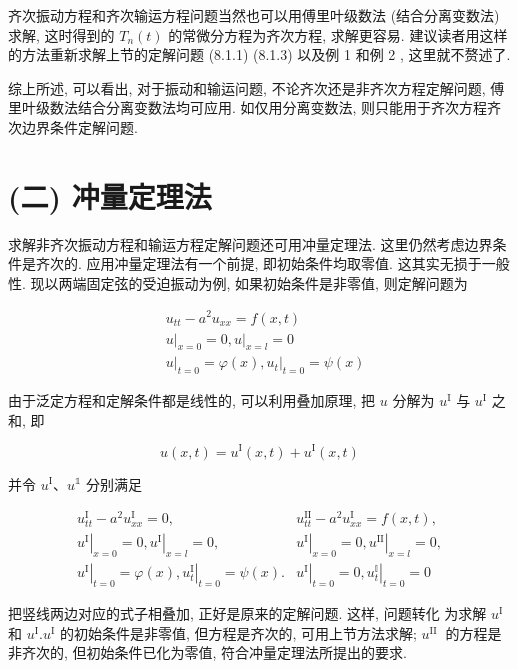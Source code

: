 齐次振动方程和齐次输运方程问题当然也可以用傅里叶级数法 (结合分离变数法) 求解, 这时得到的 $T_{n}(t)$ 的常微分方程为齐次方程, 求解更容易. 建议读者用这样的方法重新求解上节的定解问题 (8.1.1) (8.1.3) 以及例 1 和例 2 , 这里就不赘述了.

综上所述, 可以看出, 对于振动和输运问题, 不论齐次还是非齐次方程定解问题, 傅里叶级数法结合分离变数法均可应用. 如仅用分离变数法, 则只能用于齐次方程齐次边界条件定解问题.

\section{(二) 冲量定理法}
求解非齐次振动方程和输运方程定解问题还可用冲量定理法. 这里仍然考虑边界条件是齐次的. 应用冲量定理法有一个前提, 即初始条件均取零值. 这其实无损于一般性. 现以两端固定弦的受迫振动为例, 如果初始条件是非零值, 则定解问题为

$$
\begin{aligned}
& u_{t t}-a^{2} u_{x x}=f(x, t) \\
& \left.u\right|_{x=0}=0,\left.u\right|_{x=l}=0 \\
& \left.u\right|_{t=0}=\varphi(x),\left.u_{t}\right|_{t=0}=\psi(x)
\end{aligned}
$$

由于泛定方程和定解条件都是线性的, 可以利用叠加原理, 把 $u$ 分解为 $u^{\mathrm{I}}$ 与 $u^{\mathrm{I}}$ 之和, 即

$$
u(x, t)=u^{\mathrm{I}}(x, t)+u^{\mathrm{I}}(x, t)
$$

并令 $u^{\mathrm{I}} 、 u^{\mathbb{1}}$ 分别满足

$$
\begin{array}{l|l}
u_{t t}^{\mathrm{I}}-a^{2} u_{x x}^{\mathrm{I}}=0, & u_{t t}^{\mathrm{II}}-a^{2} u_{x x}^{\mathrm{I}}=f(x, t), \\
\left.u^{\mathrm{I}}\right|_{x=0}=0,\left.u^{\mathrm{I}}\right|_{x=l}=0, & \left.u^{\mathrm{I}}\right|_{x=0}=0,\left.u^{\mathrm{II}}\right|_{x=l}=0, \\
\left.u^{\mathrm{I}}\right|_{t=0}=\varphi(x),\left.u_{t}^{\mathrm{I}}\right|_{t=0}=\psi(x) . & \left.u^{\mathrm{I}}\right|_{t=0}=0,\left.u_{t}^{\mathbb{I}}\right|_{t=0}=0
\end{array}
$$

把竖线两边对应的式子相叠加, 正好是原来的定解问题. 这样, 问题转化
为求解 $u^{\mathrm{I}}$ 和 $u^{\mathrm{I}} . u^{\mathrm{I}}$ 的初始条件是非零值, 但方程是齐次的, 可用上节方法求解; $u^{\text {II }}$ 的方程是非齐次的, 但初始条件已化为零值, 符合冲量定理法所提出的要求.

